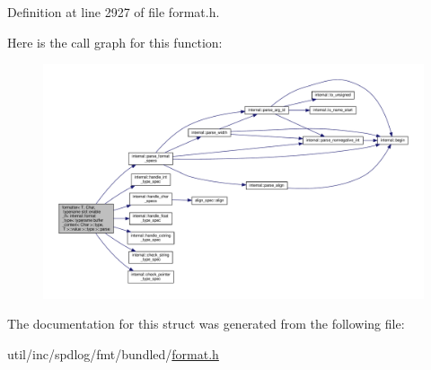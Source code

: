 Definition at line 2927 of file format.\+h.

Here is the call graph for this function\+:
\nopagebreak
\begin{figure}[H]
\begin{center}
\leavevmode
\includegraphics[width=350pt]{structformatter_3_01_t_00_01_char_00_01typename_01std_1_1enable__if_3_01internal_1_1format__typeef2b7d59b5441fbead72290e06693dea_ae66fc4d23664a9533b055208fa9692bf_cgraph}
\end{center}
\end{figure}


The documentation for this struct was generated from the following file\+:\begin{DoxyCompactItemize}
\item 
util/inc/spdlog/fmt/bundled/\hyperlink{format_8h}{format.\+h}\end{DoxyCompactItemize}
